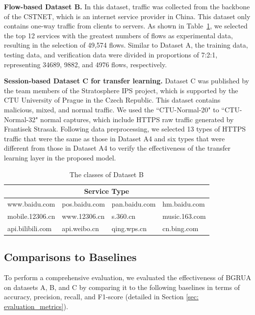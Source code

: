 \documentclass[preprint,12pt]{elsarticle}
\begin{document}
\textbf{Flow-based Dataset B.} In this dataset, traffic was collected from the backbone of the CSTNET, which is an internet service provider in China. This dataset only contains one-way traffic from clients to servers. As shown in Table~\ref{tab5}, we selected the top 12 services with the greatest numbers of flows as experimental data, resulting in the selection of 49,574 flows. Similar to Dataset A, the training data, testing data, and verification data were divided in proportions of 7:2:1, representing 34689, 9882, and 4976 flows, respectively.


\textbf{Session-based Dataset C for transfer learning.} Dataset C \cite{stratosphereips} was published by the team members of the Stratosphere IPS project, which is supported by the CTU University of Prague in the Czech Republic. This dataset contains malicious, mixed, and normal traffic. We used the ``CTU-Normal-20" to ``CTU-Normal-32" normal captures, which include HTTPS raw traffic generated by Frantisek Strasak. Following data preprocessing, we selected 13 types of HTTPS traffic that were the same as those in Dataset A4 and six types that were different from those in Dataset A4 to verify the effectiveness of the transfer learning layer in the proposed model.

\begin{table}[]
\caption{The classes of Dataset B}
\centering
\begin{tabular}{|l|l|l|l|}
\hline
\multicolumn{4}{|c|}{\textbf{Service Type}}                               \\ \hline
www.baidu.com    & pos.baidu.com & pan.baidu.com & hm.baidu.com  \\ \hline
mobile.12306.cn  & www.12306.cn  & s.360.cn      & music.163.com \\ \hline
api.bilibili.com & api.weibo.cn  & qing.wps.cn   & cn.bing.com   \\ \hline
\end{tabular}
\label{tab5}
\end{table}


\subsection{Comparisons to Baselines}
To perform a comprehensive evaluation, we evaluated the effectiveness of BGRUA on datasets A, B, and C by comparing it to the following baselines in terms of accuracy, precision, recall, and F1-score (detailed in Section \ref{sec: evaluation_metrics}).
\end{document}
